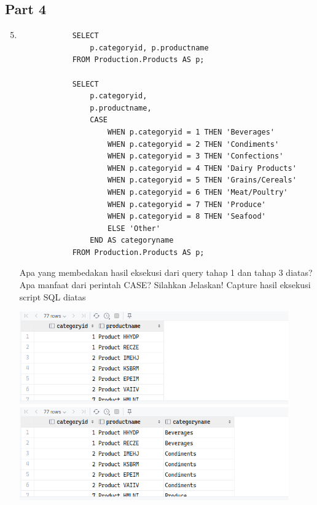 \documentclass[12pt,titlepage]{article}
\begin{document}
\subsection{Part 4}
\begin{enumerate}
    \setcounter{enumi}{4}
    \item {
        \begin{verbatim}
            SELECT
                p.categoryid, p.productname
            FROM Production.Products AS p;

            SELECT
                p.categoryid,
                p.productname,
                CASE
                    WHEN p.categoryid = 1 THEN 'Beverages'
                    WHEN p.categoryid = 2 THEN 'Condiments'
                    WHEN p.categoryid = 3 THEN 'Confections'
                    WHEN p.categoryid = 4 THEN 'Dairy Products'
                    WHEN p.categoryid = 5 THEN 'Grains/Cereals'
                    WHEN p.categoryid = 6 THEN 'Meat/Poultry'
                    WHEN p.categoryid = 7 THEN 'Produce'
                    WHEN p.categoryid = 8 THEN 'Seafood'
                    ELSE 'Other'
                END AS categoryname
            FROM Production.Products AS p;
        \end{verbatim}

        \pagebreak

        Apa yang membedakan hasil eksekusi dari query tahap 1 dan tahap 3 diatas? Apa manfaat
        dari perintah CASE? Silahkan Jelaskan! Capture hasil eksekusi script SQL diatas

        \begin{center}
            \includegraphics[height=4cm]{./images/p4-n1-a.png}\\
            \includegraphics[height=4cm]{./images/p4-n1-b.png}
        \end{center}

}
\end{enumerate}
\end{document}
